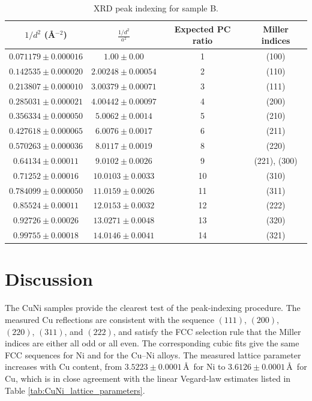 \documentclass[12pt]{article}
\begin{document}
\begin{table}[H]
\centering
\begin{tabular}{c c c c}
\hline
$1/d^2$ (\AA$^{-2}$) &
$\frac{1/d^2}{a^2}$ &
Expected PC ratio &
Miller indices \\
\hline
\hline
$0.071179 \pm 0.000016$ & $1.00 \pm 0.00$ & 1  & (100) \\
$0.142535 \pm 0.000020$ & $2.00248 \pm 0.00054$ & 2  & (110) \\
$0.213807 \pm 0.000010$ & $3.00379 \pm 0.00071$ & 3  & (111) \\
$0.285031 \pm 0.000021$ & $4.00442 \pm 0.00097$ & 4  & (200) \\
$0.356334 \pm 0.000050$ & $5.0062 \pm 0.0014$ & 5  & (210) \\
$0.427618 \pm 0.000065$ & $6.0076 \pm 0.0017$ & 6  & (211) \\
$0.570263 \pm 0.000036$ & $8.0117 \pm 0.0019$ & 8  & (220) \\
$0.64134 \pm 0.00011$ & $9.0102 \pm 0.0026$ & 9  & (221), (300) \\
$0.71252 \pm 0.00016$ & $10.0103 \pm 0.0033$ & 10 & (310) \\
$0.784099 \pm 0.000050$ & $11.0159 \pm 0.0026$ & 11 & (311) \\
$0.85524 \pm 0.00011$ & $12.0153 \pm 0.0032$ & 12 & (222) \\
$0.92726 \pm 0.00026$ & $13.0271 \pm 0.0048$ & 13 & (320) \\
$0.99755 \pm 0.00018$ & $14.0146 \pm 0.0041$ & 14 & (321) \\
\hline
\end{tabular}
\caption{XRD peak indexing for sample B.}
\label{tab:B_indexing}
\end{table}

\section{Discussion}\label{sec:dis}
The CuNi samples provide the clearest test of the peak-indexing procedure. The measured Cu reflections are consistent with the sequence $(111)$, $(200)$, $(220)$, $(311)$, and $(222)$,
and satisfy the FCC selection rule that the Miller indices are either all odd or all even. The corresponding cubic fits give the same FCC sequences for Ni and for the Cu--Ni alloys. The
measured lattice parameter increases with Cu content, from $3.5223 \pm 0.0001$\,\AA\ for Ni to $3.6126 \pm 0.0001$\,\AA\ for Cu, which is in close agreement with the linear Vegard-law estimates
listed in Table \ref{tab:CuNi_lattice_parameters}.
\end{document}
